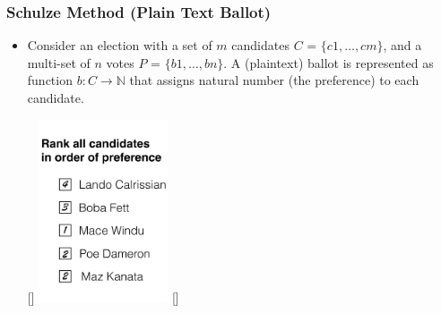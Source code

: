 \documentclass{beamer}
\begin{document}

\begin{frame}
\frametitle{Schulze Method (Plain Text Ballot)}

\begin{itemize}
\item Consider an election with a set of $m$ candidates $C$ = $\{c1,\dots,cm\}$, and 
	a multi-set of $n$ votes $P$ = $\{b1,\dots,bn\}$. A (plaintext) ballot
	is represented as function $b: C \rightarrow \mathbb{N}$ that 
	assigns natural 	number (the preference) to each candidate.

  \begin{center}
    \raisebox{0pt}[\dimexpr{}\baselineskip\relax]
    {\includegraphics[width=0.30\textwidth]{bal-cropped.pdf}}
    \raisebox{0pt}[\dimexpr{}\baselineskip\relax]{}
  \end{center}

\end{itemize}
\end{frame}
\end{document}
